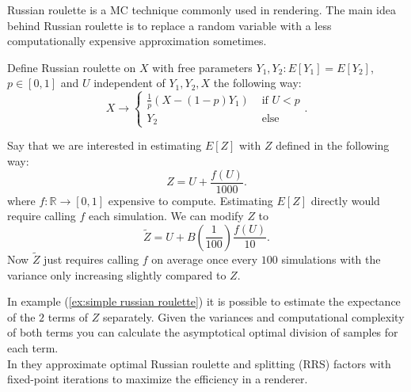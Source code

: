 \documentclass[a4paper,12pt]{article}
\begin{document}
Russian roulette is a MC technique commonly used in rendering.
The main idea behind Russian roulette is to replace a random variable
with a less computationally expensive approximation sometimes.

\begin{definition} \label{Russian roulette}
    Define Russian roulette on $X$ with free parameters
    $Y_{1},Y_{2}: E[Y_{1}] = E[Y_{2}]$, $p \in [0,1]$ and $U$
    independent of $Y_{1},Y_{2},X$ the following way:
    \begin{equation}
        X \rightarrow \begin{cases}
            \frac{1}{p}(X- (1-p)Y_{1}) & \text{ if } U<p \\
            Y_{2}                      & \text{ else }
        \end{cases}.
    \end{equation}
\end{definition}

\begin{example} \label{ex:simple russian roulette}
    Say that we are interested in estimating $E[Z]$ with $Z$
    defined in the following way:
    \begin{equation}
        Z = U + \frac{f(U)}{1000}.
    \end{equation}
    where $f:\mathbb{R} \rightarrow [0,1]$ expensive to compute.
    Estimating $E[Z]$ directly would require calling $f$ each
    simulation. We can modify $Z$ to
    \begin{equation}
        \tilde{Z} = U + B\left(\frac{1}{100}\right)\frac{f(U)}{10}.
    \end{equation}
    Now $\tilde{Z}$
    just requires calling $f$ on average once every $100$ simulations with the variance
    only increasing slightly compared to $Z$. \\

\end{example}

\begin{related}
    In example (\ref{ex:simple russian roulette}) it is possible to estimate
    the expectance of the $2$ terms of $Z$ separately. Given the variances and
    computational complexity  of both terms you can calculate the asymptotical optimal
    division of samples for each term. \\
    In \cite{rath_ears_2022} they approximate optimal Russian roulette and splitting
    (RRS) factors with fixed-point iterations to maximize the efficiency in a renderer.
\end{related}
\end{document}
